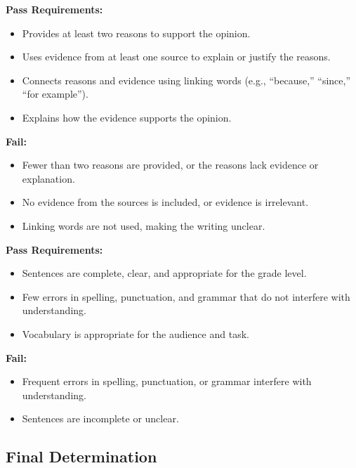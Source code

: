 \documentclass[12pt]{article}
\begin{document}
\begin{tcolorbox}[colframe=black!60, colback=white, title=Evidence and Elaboration]
\textbf{Pass Requirements:}
\begin{itemize}
    \item Provides at least two reasons to support the opinion.
    \item Uses evidence from at least one source to explain or justify the reasons.
    \item Connects reasons and evidence using linking words (e.g., “because,” “since,” “for example”).
    \item Explains how the evidence supports the opinion.
\end{itemize}

\textbf{Fail:}
\begin{itemize}
    \item Fewer than two reasons are provided, or the reasons lack evidence or explanation.
    \item No evidence from the sources is included, or evidence is irrelevant.
    \item Linking words are not used, making the writing unclear.
\end{itemize}
\end{tcolorbox}

\begin{tcolorbox}[colframe=black!60, colback=white, title=Language and Conventions]
\textbf{Pass Requirements:}
\begin{itemize}
    \item Sentences are complete, clear, and appropriate for the grade level.
    \item Few errors in spelling, punctuation, and grammar that do not interfere with understanding.
    \item Vocabulary is appropriate for the audience and task.
\end{itemize}

\textbf{Fail:}
\begin{itemize}
    \item Frequent errors in spelling, punctuation, or grammar interfere with understanding.
    \item Sentences are incomplete or unclear.
\end{itemize}
\end{tcolorbox}

\subsection*{Final Determination}
\end{document}
